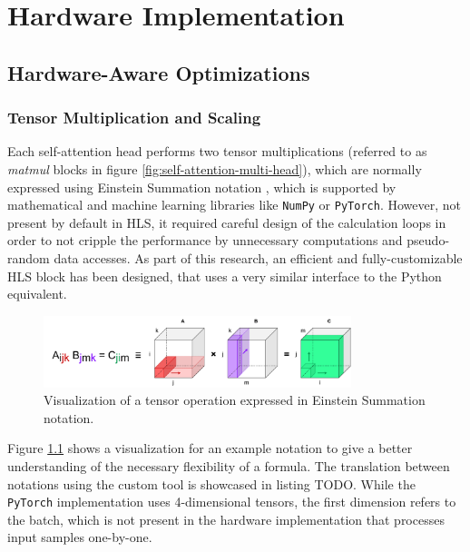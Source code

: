 \chapter{Hardware Implementation}\label{quantization}

\section{Hardware-Aware Optimizations}

\subsection{Tensor Multiplication and Scaling}
Each self-attention head performs two tensor multiplications (referred to as \textit{matmul} blocks in figure \ref{fig:self-attention-multi-head}), which are normally expressed using Einstein Summation notation \cite{59-barr1991einstein}, which is supported by mathematical and machine learning libraries like \texttt{NumPy} or \texttt{PyTorch}. However, not present by default in HLS, it required careful design of the calculation loops in order to not cripple the performance by unnecessary computations and pseudo-random data accesses. As part of this research, an efficient and fully-customizable HLS block has been designed, that uses a very similar interface to the Python equivalent.

\begin{figure}[hpt!]
  \centering
  \includegraphics[trim={0cm 0cm 0cm 0cm}, width=0.8\textwidth, center]{models/einsum.pdf}
  \caption{Visualization of a tensor operation expressed in Einstein Summation notation.}
  \label{fig:einsum}
\end{figure}

Figure \ref{fig:einsum} shows a visualization for an example notation to give a better understanding of the necessary flexibility of a formula. The translation between notations using the custom tool is showcased in listing TODO. While the \texttt{PyTorch} implementation uses 4-dimensional tensors, the first dimension refers to the batch, which is not present in the hardware implementation that processes input samples one-by-one.

\todofig{|}
\todofig{|}
\todofig{|}
\todofig{|}
\todofig{|}

